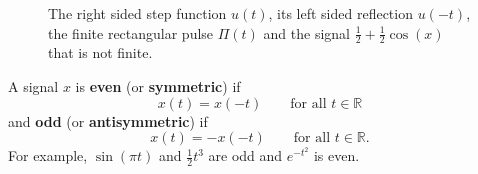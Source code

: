 \documentclass[11pt,a4paper]{book}
\theoremstyle{plain}
\numberwithin{equation}{section}
\newcommand{\reals}{{\mathbb R}}
\newcommand{\term}{\textbf}
\begin{document}
\begin{figure}[tp]
\caption{The right sided step function $u(t)$, its left sided reflection $u(-t)$, the finite rectangular pulse $\Pi(t)$ and the signal $\tfrac{1}{2} + \tfrac{1}{2}\cos(x)$ that is not finite.  %
} 
\label{fig:stepsided}
\end{figure}

A signal $x$ is \term{even} (or \term{symmetric}) if
\[
x(t) = x(-t) \qquad  \text{for all $t \in \reals$}
\] 
and \term{odd} (or \term{antisymmetric}) if 
\[
x(t) = -x(-t) \qquad \text{for all $t \in \reals$}.
\] 
For example, $\sin(\pi t)$ and $\tfrac{1}{2}t^3$ are odd and $e^{-t^2}$ is even.  %
\end{document}
